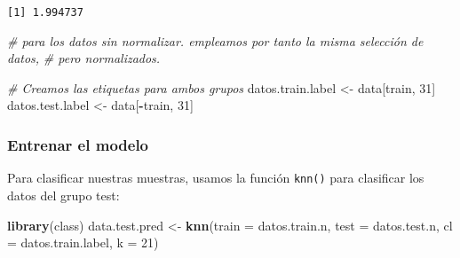 \documentclass[
]{article}
\newenvironment{Shaded}{\begin{snugshade}}{\end{snugshade}}
\newcommand{\CommentTok}[1]{\textcolor[rgb]{0.56,0.35,0.01}{\textit{#1}}}
\newcommand{\DataTypeTok}[1]{\textcolor[rgb]{0.13,0.29,0.53}{#1}}
\newcommand{\DecValTok}[1]{\textcolor[rgb]{0.00,0.00,0.81}{#1}}
\newcommand{\KeywordTok}[1]{\textcolor[rgb]{0.13,0.29,0.53}{\textbf{#1}}}
\newcommand{\NormalTok}[1]{#1}
\newcommand{\OperatorTok}[1]{\textcolor[rgb]{0.81,0.36,0.00}{\textbf{#1}}}
\newcommand{\StringTok}[1]{\textcolor[rgb]{0.31,0.60,0.02}{#1}}
\begin{document}
\begin{Shaded}
\end{Shaded}

\begin{verbatim}
[1] 1.994737
\end{verbatim}

\begin{Shaded}
\begin{Highlighting}[]
\CommentTok{# para los datos sin normalizar. empleamos por tanto la misma selección de datos,}
\CommentTok{# pero normalizados.}

\CommentTok{# Creamos las etiquetas para ambos grupos}
\NormalTok{datos.train.label <-}\StringTok{ }\NormalTok{data[train, }\DecValTok{31}\NormalTok{]}
\NormalTok{datos.test.label <-}\StringTok{ }\NormalTok{data[}\OperatorTok{-}\NormalTok{train, }\DecValTok{31}\NormalTok{]}
\end{Highlighting}
\end{Shaded}

\hypertarget{entrenar-el-modelo}{%
\subsubsection{Entrenar el modelo}\label{entrenar-el-modelo}}

Para clasificar nuestras muestras, usamos la función \texttt{knn()} para
clasificar los datos del grupo test:

\begin{Shaded}
\begin{Highlighting}[]
\KeywordTok{library}\NormalTok{(class)}
\NormalTok{data.test.pred <-}\StringTok{ }\KeywordTok{knn}\NormalTok{(}\DataTypeTok{train =}\NormalTok{ datos.train.n, }\DataTypeTok{test =}\NormalTok{ datos.test.n,}
                      \DataTypeTok{cl =}\NormalTok{ datos.train.label, }\DataTypeTok{k =} \DecValTok{21}\NormalTok{)}
\end{Highlighting}
\end{Shaded}
\end{document}
